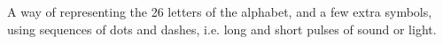 A way of representing the 26 letters of the alphabet, 
and a few extra symbols, using sequences of dots
and dashes, i.e. long and short pulses of sound or light.